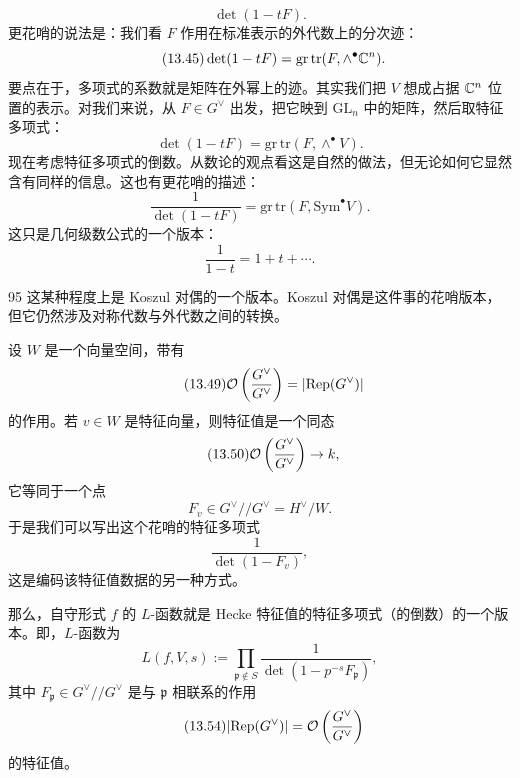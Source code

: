 \begin{equation}\tag{13.44}
\det(1-tF).
\end{equation}
更花哨的说法是：我们看 $F$ 作用在标准表示的外代数上的分次迹：
\begin{equation}\tag{13.45}
\det(1-tF)=\mathrm{gr\,tr}(F,\wedge^\bullet\mathbb{C}^n).
\end{equation}
要点在于，多项式的系数就是矩阵在外幂上的迹。其实我们把 $V$ 想成占据 $\mathbb{C}^n$ 位置的表示。对我们来说，从 $F\in G^\vee$ 出发，把它映到 $\mathrm{GL}_n$ 中的矩阵，然后取特征多项式：
\begin{equation}\tag{13.46}
\det(1-tF)=\mathrm{gr\,tr}(F,\wedge^\bullet V).
\end{equation}
现在考虑特征多项式的倒数。从数论的观点看这是自然的做法，但无论如何它显然含有同样的信息。这也有更花哨的描述：
\begin{equation}\tag{13.47}
\frac{1}{\det(1-tF)}=\mathrm{gr\,tr}(F,\mathrm{Sym}^\bullet V).
\end{equation}
这只是几何级数公式的一个版本：
\begin{equation}\tag{13.48}
\frac{1}{1-t}=1+t+\cdots.
\end{equation}

\begin{srcrem}{95}
这某种程度上是 Koszul 对偶的一个版本。Koszul 对偶是这件事的花哨版本，但它仍然涉及对称代数与外代数之间的转换。
\end{srcrem}

设 $W$ 是一个向量空间，带有
\begin{equation}\tag{13.49}
\mathcal{O}\left(\frac{G^\vee}{G^\vee}\right)=|\mathrm{Rep}(G^\vee)|
\end{equation}
的作用。若 $v\in W$ 是特征向量，则特征值是一个同态
\begin{equation}\tag{13.50}
\mathcal{O}\left(\frac{G^\vee}{G^\vee}\right)\to k,
\end{equation}
它等同于一个点
\begin{equation}\tag{13.51}
F_v\in G^\vee/\!/G^\vee=H^\vee/W.
\end{equation}
于是我们可以写出这个花哨的特征多项式
\begin{equation}\tag{13.52}
\frac{1}{\det(1-F_v)},
\end{equation}
这是编码该特征值数据的另一种方式。

那么，自守形式 $f$ 的 $L$-函数就是 Hecke 特征值的特征多项式（的倒数）的一个版本。即，$L$-函数为
\begin{equation}\tag{13.53}
L(f,V,s):=\prod_{\mathfrak p\notin S}\frac{1}{\det(1-p^{-s}F_{\mathfrak p})},
\end{equation}
其中 $F_{\mathfrak p}\in G^\vee/\!/G^\vee$ 是与 $\mathfrak p$ 相联系的作用
\begin{equation}\tag{13.54}
|\mathrm{Rep}(G^\vee)|=\mathcal{O}\left(\frac{G^\vee}{G^\vee}\right)
\end{equation}
的特征值。

